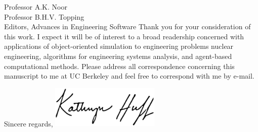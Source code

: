 \documentclass[11pt]{letter} %
\begin{document}
\begin{letter}{Professor A.K. Noor\\
Professor B.H.V. Topping\\
Editors, Advances in Engineering Software}
Thank you for your consideration of this work. I expect it will be of interest
to a broad readership concerned with applications of object-oriented simulation 
to engineering problems nuclear engineering, algorithms for engineering systems 
analysis, and agent-based computational methods. Please address all 
correspondence concerning this manuscript to me at UC Berkeley and feel free to 
correspond with me by e-mail.

\closing{Sincere regards,
\includegraphics[height=2cm]{signature}\\
}


\end{letter}
\end{document}
